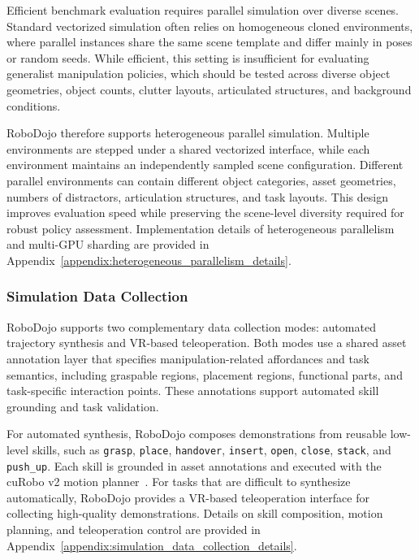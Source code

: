 Efficient benchmark evaluation requires parallel simulation over diverse scenes. Standard vectorized simulation often relies on homogeneous cloned environments, where parallel instances share the same scene template and differ mainly in poses or random seeds. While efficient, this setting is insufficient for evaluating generalist manipulation policies, which should be tested across diverse object geometries, object counts, clutter layouts, articulated structures, and background conditions.

RoboDojo therefore supports heterogeneous parallel simulation. Multiple environments are stepped under a shared vectorized interface, while each environment maintains an independently sampled scene configuration. Different parallel environments can contain different object categories, asset geometries, numbers of distractors, articulation structures, and task layouts. This design improves evaluation speed while preserving the scene-level diversity required for robust policy assessment. Implementation details of heterogeneous parallelism and multi-GPU sharding are provided in Appendix~\ref{appendix:heterogeneous_parallelism_details}.

\subsubsection{Simulation Data Collection}

RoboDojo supports two complementary data collection modes: automated trajectory synthesis and VR-based teleoperation. Both modes use a shared asset annotation layer that specifies manipulation-related affordances and task semantics, including graspable regions, placement regions, functional parts, and task-specific interaction points. These annotations support automated skill grounding and task validation.

For automated synthesis, RoboDojo composes demonstrations from reusable low-level skills, such as \texttt{grasp}, \texttt{place}, \texttt{handover}, \texttt{insert}, \texttt{open}, \texttt{close}, \texttt{stack}, and \texttt{push\_up}. Each skill is grounded in asset annotations and executed with the cuRobo v2 motion planner~\citep{sundaralingam2026curobov2dynamicsawaremotiongeneration}. For tasks that are difficult to synthesize automatically, RoboDojo provides a VR-based teleoperation interface for collecting high-quality demonstrations. Details on skill composition, motion planning, and teleoperation control are provided in Appendix~\ref{appendix:simulation_data_collection_details}.
